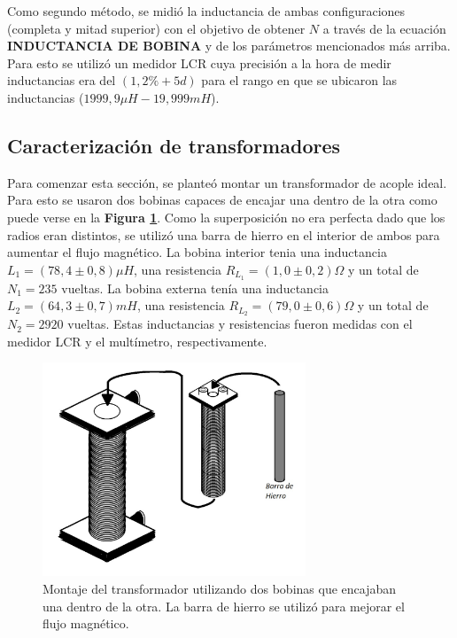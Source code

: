 \documentclass[11pt,a4paper]{article}
\begin{document}
Como segundo método, se midió la inductancia de ambas configuraciones (completa y mitad superior) con el objetivo de obtener $N$ a través de la ecuación \textbf{INDUCTANCIA DE BOBINA} y de los parámetros mencionados más arriba. Para esto se utilizó un medidor LCR cuya precisión a la hora de medir inductancias era del $(1,2\%+5d)$ para el rango en que se ubicaron las inductancias ($1999,9\mu H-19,999mH$).


\subsection{Caracterización de transformadores}

Para comenzar esta sección, se planteó montar un transformador de acople ideal. Para esto se usaron dos bobinas capaces de encajar una dentro de la otra como puede verse en la \textbf{Figura \ref{fig:transmont}}. Como la superposición no era perfecta dado que los radios eran distintos, se utilizó una barra de hierro en el interior de ambos para aumentar el flujo magnético. La bobina interior tenia una inductancia $L_1 = (78,4 \pm 0,8)\mu H$, una resistencia $R_{L_1}=(1,0 \pm 0,2)\Omega$ y un total de $N_1=235$ vueltas. La bobina externa tenía una inductancia $L_2 = (64,3 \pm 0,7)mH$, una resistencia $R_{L_2}=(79,0 \pm 0,6)\Omega$ y un total de $N_2=2920$ vueltas. Estas inductancias y resistencias fueron medidas con el medidor LCR y el multímetro, respectivamente.

\begin{figure}[h!]
\centering
   \includegraphics[width=0.7\textwidth]{Transformadores1}
   \caption{Montaje del transformador utilizando dos bobinas que encajaban una dentro de la otra. La barra de hierro se utilizó para mejorar el flujo magnético.}  
   \label{fig:transmont}
\end{figure}
\end{document}
